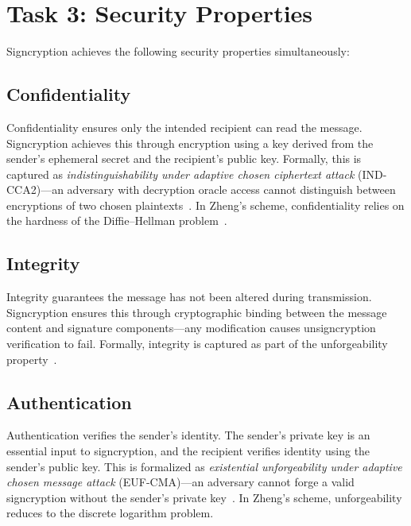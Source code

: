 \documentclass[11pt,a4paper]{article}
\begin{document}
\section{Task 3: Security Properties}

Signcryption achieves the following security properties simultaneously:

\subsection{Confidentiality}

Confidentiality ensures only the intended recipient can read the message. Signcryption achieves this through encryption using a key derived from the sender's ephemeral secret and the recipient's public key. Formally, this is captured as \textit{indistinguishability under adaptive chosen ciphertext attack} (IND-CCA2)---an adversary with decryption oracle access cannot distinguish between encryptions of two chosen plaintexts~\cite{baek2002}. In Zheng's scheme, confidentiality relies on the hardness of the Diffie--Hellman problem~\cite{zheng1997}.

\subsection{Integrity}

Integrity guarantees the message has not been altered during transmission. Signcryption ensures this through cryptographic binding between the message content and signature components---any modification causes unsigncryption verification to fail. Formally, integrity is captured as part of the unforgeability property~\cite{baek2002}.

\subsection{Authentication}

Authentication verifies the sender's identity. The sender's private key is an essential input to signcryption, and the recipient verifies identity using the sender's public key. This is formalized as \textit{existential unforgeability under adaptive chosen message attack} (EUF-CMA)---an adversary cannot forge a valid signcryption without the sender's private key~\cite{baek2002}. In Zheng's scheme, unforgeability reduces to the discrete logarithm problem.
\end{document}
